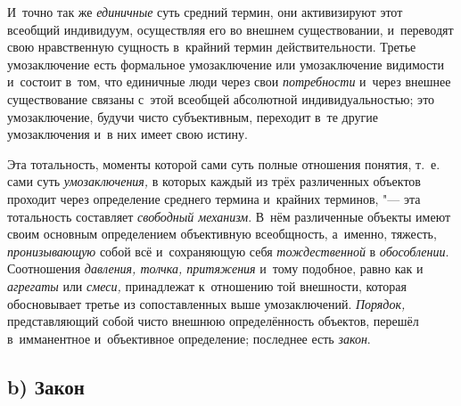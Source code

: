 И~точно так же
{\em единичные} суть
средний термин, они активизируют этот всеобщий индивидуум, осуществляя его
во внешнем существовании, и~переводят свою нравственную сущность в~крайний
термин
действительности.
Третье умозаключение есть формальное умозаключение или
умозаключение видимости и~состоит в~том, что единичные люди через свои
{\em потребности} и~через
внешнее существование связаны с~этой всеобщей абсолютной индивидуальностью;
это умозаключение, будучи чисто субъективным, переходит в~те другие
умозаключения и~в них имеет свою
истину\label{bkm:bm52c}.

Эта тотальность, моменты которой сами суть полные отношения
понятия, т.~е. сами суть
{\em умозаключения,} в
которых каждый из трёх различенных объектов проходит через определение
среднего термина и~крайних терминов, "--- эта тотальность
составляет {\em свободный механизм}.
В~нём различенные объекты имеют своим основным определением
объективную всеобщность, а~именно, тяжесть,
{\em пронизывающую} собой
всё и~сохраняющую себя
{\em тождественной} в
{\em обособлении}.
Соотношения {\em давления,
толчка, притяжения} и~тому подобное, равно как и
{\em агрегаты} или
{\em смеси,} принадлежат
к~отношению той внешности, которая обосновывает третье из
сопоставленных выше умозаключений.
{\em Порядок,}
представляющий собой чисто внешнюю определённость объектов,
перешёл в~имманентное и~объективное определение; последнее есть
{\em закон}.

\subsection[b) Закон]{b) Закон}


